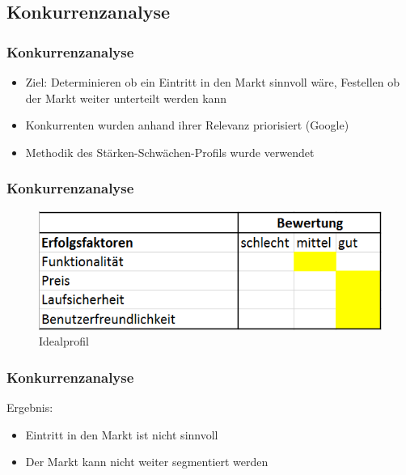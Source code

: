 \subsection{Konkurrenzanalyse}
\begin{frame}
\frametitle{Konkurrenzanalyse}
\begin{itemize}
\item Ziel: Determinieren ob ein Eintritt in den Markt sinnvoll wäre, Festellen ob der Markt weiter unterteilt werden kann
\item Konkurrenten wurden anhand ihrer Relevanz priorisiert (Google)
\item Methodik des Stärken-Schwächen-Profils wurde verwendet
\end{itemize}
\end{frame}
\begin{frame}
\frametitle{Konkurrenzanalyse}
\begin{figure}
\includegraphics[scale=0.6]{Idealprofil}
\caption{Idealprofil}
\end{figure}
\end{frame}
\begin{frame}
\frametitle{Konkurrenzanalyse}
Ergebnis:
\newline
\begin{itemize}
\item Eintritt in den Markt ist nicht sinnvoll
\item Der Markt kann nicht weiter segmentiert werden
\end{itemize}
\end{frame}
